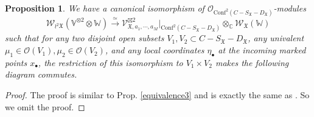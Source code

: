 \documentclass[11pt,b5paper,notitlepage]{article}
\theoremstyle{definition}
\theoremstyle{plain}
\newtheorem{pp}[df]{Proposition}
\newcommand{\Conf}{\mathrm{Conf}}
\newcommand{\SV}{\mathscr{V}}
\newcommand{\blt}{\bullet}
\newcommand{\Vbb}{\mathbb V}
\newcommand{\Wbb}{\mathbb W}
\newcommand{\Cbb}{\mathbb C}
\newcommand{\pr}{\mathrm {pr}}
\newcommand{\<}{\left\langle}
\renewcommand{\>}{\right\rangle}
\newcommand{\MO}{\mathcal{O}}
\newcommand{\fx}{\mathfrak{X}}
\newcommand{\SW}{\mathscr{W}}
\numberwithin{equation}{section}
\begin{document}
\begin{pp}\label{equivalence4}
    We have a canonical isomorphism of $\MO_{\Conf^2(C-S_\fx-D_\fx)}$-modules
    $$
    \SW_{\wr^2\fx}(\Vbb^{\otimes 2}\otimes \Wbb)\xrightarrow{\simeq} \SV_{\fx,a_1,\cdots,a_M}^{\boxtimes 2}\vert_{\Conf^2(C-S_\fx-D_\fx)}\otimes_\Cbb \SW_\fx(\Wbb)
    $$
    such that for any two disjoint open subsets $V_1,V_2\subset C-S_\fx-D_\fx$, any univalent $\mu_1\in \MO(V_1),\mu_2\in \MO(V_2)$, and any local coordinates $\eta_\blt$ at the incoming marked points $x_\blt$, the restriction of this isomorphism to $V_1\times V_2$ makes the following diagram commutes.
    \begin{center}
\end{center}
\end{pp}
\begin{proof}
    The proof is similar to Prop. \ref{equivalence3} and is exactly the same as \cite[Prop. 8.1]{Gui-propagation}. So we omit the proof.  %
\end{proof}
\end{document}
